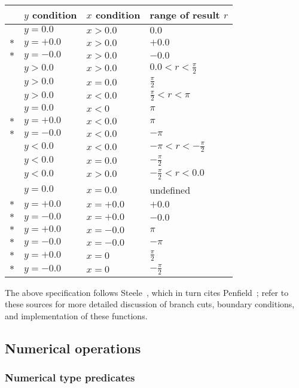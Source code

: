 \begin{center}
\begin{tabular}{clll}
& $y$ condition & $x$ condition & range of result $r$\\\hline
& $y = 0.0$ & $x > 0.0$ & $0.0$\\
$\ast$ & $y = +0.0$  & $x > 0.0$ & $+0.0$\\     
$\ast$ & $y = -0.0$ & $x > 0.0$ & $-0.0$\\
& $y > 0.0$ & $x > 0.0$ & $0.0 < r < \frac{\pi}{2}$\\
& $y > 0.0$ & $x = 0.0$ & $\frac{\pi}{2}$\\
& $y > 0.0$ & $x < 0.0$ & $\frac{\pi}{2} < r < \pi$\\
& $y = 0.0$ & $x < 0$ & $\pi$\\
$\ast$ & $y = +0.0$ & $x < 0.0$ & $\pi$\\
$\ast$ & $y = -0.0$ & $x < 0.0$ & $-\pi$\\      
&$y < 0.0$ & $x < 0.0$ & $-\pi< r< -\frac{\pi}{2}$\\
&$y < 0.0$ & $x = 0.0$ & $-\frac{\pi}{2}$\\
&$y < 0.0$ & $x > 0.0$ & $-\frac{\pi}{2} < r< 0.0$\\    
&$y = 0.0$ & $x = 0.0$ & undefined\\
$\ast$& $y = +0.0$ & $x = +0.0$ & $+0.0$\\
$\ast$& $y = -0.0$ & $x = +0.0$& $-0.0$\\
$\ast$& $y = +0.0$ & $x = -0.0$ & $\pi$\\
$\ast$& $y = -0.0$ & $x = -0.0$ & $-\pi$\\
$\ast$& $y = +0.0$ & $x = 0$ & $\frac{\pi}{2}$\\
$\ast$& $y = -0.0$ & $x = 0$    & $-\frac{\pi}{2}$
\end{tabular}
\end{center}

The above specification follows Steele~\cite{CLtL}, which in turn
cites Penfield~\cite{Penfield81}; refer to these sources for more detailed
discussion of branch cuts, boundary conditions, and implementation of
these functions.

\subsection{Numerical operations}

\subsubsection{Numerical type predicates}

